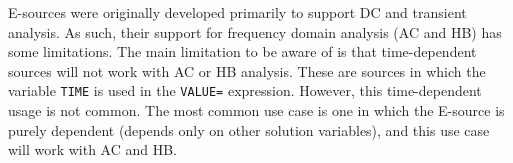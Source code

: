 \begin{Device}
E-sources were originally developed primarily to support DC and transient analysis.  
As such, their support for frequency domain analysis (AC and HB) has some limitations.  
The main limitation to be aware of is that time-dependent sources will not work with AC or HB analysis.  
These are sources in which the variable \texttt{TIME} is used in the \texttt{VALUE=} expression. 
However, this time-dependent usage is not common.  The most 
common use case is one in which the E-source is purely dependent (depends only 
on other solution variables), and this use case will work with AC and HB.  

\end{Device}
